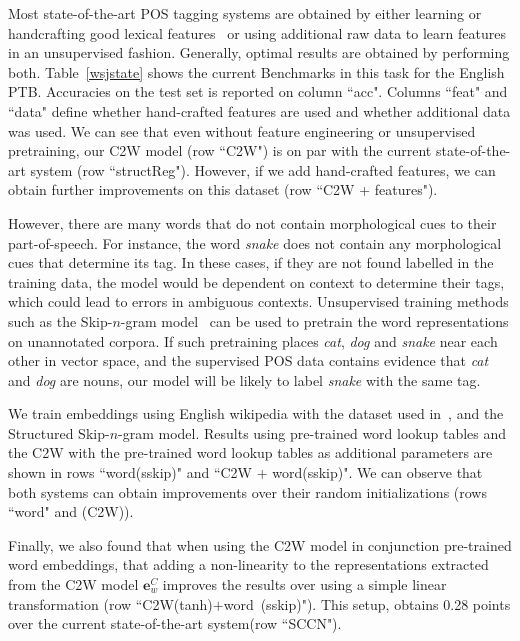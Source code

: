 \documentclass[11pt]{article}
\begin{document}
\begin{CJK*}{UTF8}{gbsn}
Most state-of-the-art POS tagging systems are obtained by either learning or handcrafting good lexical features~\cite{Manning:2011:PT9:1964799.1964816,DBLP:journals/corr/Sun14c} or using additional raw data to learn features in an unsupervised fashion. Generally, optimal results are obtained by performing both. Table~\ref{wsjstate} shows the current Benchmarks in this task for the English PTB. Accuracies on the test set is reported on column ``acc". Columns ``feat" and ``data" define whether hand-crafted features are used and whether additional data was used. We can see that even without feature engineering or unsupervised pretraining, our C2W model (row ``C2W") is on par with the current state-of-the-art system (row ``structReg"). However, if we add hand-crafted features, we can obtain further improvements on this dataset (row ``C2W + features"). 

However, there are many words that do not contain morphological cues to their part-of-speech. For instance, the word \emph{snake} does not contain any morphological cues that determine its tag. In these cases, if they are not found labelled in the training data, the model would be dependent on context to determine their tags, which could lead to errors in ambiguous contexts. Unsupervised training methods such as the Skip-$n$-gram model~\cite{mikolov2013distributed} can be used to pretrain the word representations on unannotated corpora. If such pretraining places \emph{cat}, \emph{dog} and \emph{snake} near each other in vector space, and the supervised POS data contains evidence that \emph{cat} and \emph{dog} are nouns, our model will be likely to label \emph{snake} with the same tag.

We train embeddings using English wikipedia with the dataset used in~\cite{Ling:2015:naacl}, and the Structured Skip-$n$-gram model. Results using pre-trained word lookup tables and the C2W with the pre-trained word lookup tables as additional parameters are shown in rows ``word(sskip)" and ``C2W + word(sskip)". We can observe that both systems can obtain improvements over their random initializations (rows ``word" and (C2W)). 

Finally, we also found that when using the C2W model in conjunction pre-trained word embeddings, that adding a non-linearity to the representations extracted from the C2W model $\mathbf{e}^C_w$ improves the results over using a simple linear transformation (row ``C2W(tanh)$+$word~(sskip)"). This setup, obtains 0.28 points over the current state-of-the-art system(row ``SCCN").


\end{CJK*}
\end{document}
